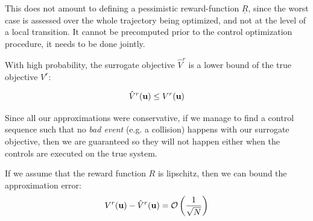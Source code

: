 \documentclass{article}
\begin{document}
This does not amount to defining a pessimistic reward-function $\underline{R}$, since the worst case is assessed over the whole trajectory being optimized, and not at the level of a local transition. It cannot be precomputed prior to the control optimization procedure, it needs to be done jointly.

%

\begin{proposition}
\label{prop:lower-bound}
With high probability, the surrogate objective $\hat{V}^r$ is a lower bound of the true objective $V^r$:

\begin{equation}
\hat{V}^r(\mathbf{u}) \leq V^r(\mathbf{u})
\end{equation}
\end{proposition}

Since all our approximations were conservative, if we manage to find a control sequence such that no \textit{bad event} (e.g. a collision) happens with our surrogate objective, then we are guaranteed so they will not happen either when the controls are executed on the true system.

\begin{proposition}
\label{prop:control-error}
If we assume that the reward function $R$ is lipschitz, then we can bound the approximation error:
\begin{equation*}
     V^r(\mathbf{u}) - \hat{V}^r(\mathbf{u}) = \mathcal{O}\left(\frac{1}{\sqrt{N}}\right)
\end{equation*}
\end{proposition}
\end{document}
